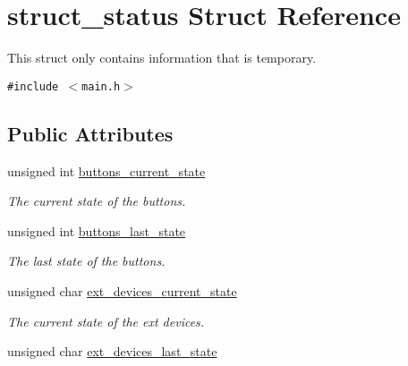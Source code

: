 \hypertarget{structstruct__status}{
\section{struct\_\-status Struct Reference}
\label{structstruct__status}
}
This struct only contains information that is temporary.  


{\tt \#include $<$main.h$>$}

\subsection*{Public Attributes}
\begin{CompactItemize}
\item 
\hypertarget{structstruct__status_17075fb3335e44596c7480fccd4354a5}{
unsigned int \hyperlink{structstruct__status_17075fb3335e44596c7480fccd4354a5}{buttons\_\-current\_\-state}}
\label{structstruct__status_17075fb3335e44596c7480fccd4354a5}

\begin{CompactList}\small\item\em The current state of the buttons. \item\end{CompactList}\item 
\hypertarget{structstruct__status_73d35cd75aa069f7718f242f08217dbd}{
unsigned int \hyperlink{structstruct__status_73d35cd75aa069f7718f242f08217dbd}{buttons\_\-last\_\-state}}
\label{structstruct__status_73d35cd75aa069f7718f242f08217dbd}

\begin{CompactList}\small\item\em The last state of the buttons. \item\end{CompactList}\item 
\hypertarget{structstruct__status_6300b45fc1b3f0a14c659a9d5da638fb}{
unsigned char \hyperlink{structstruct__status_6300b45fc1b3f0a14c659a9d5da638fb}{ext\_\-devices\_\-current\_\-state}}
\label{structstruct__status_6300b45fc1b3f0a14c659a9d5da638fb}

\begin{CompactList}\small\item\em The current state of the ext devices. \item\end{CompactList}\item 
\hypertarget{structstruct__status_466e0b0b014bf5cb62e205ac58dde530}{
unsigned char \hyperlink{structstruct__status_466e0b0b014bf5cb62e205ac58dde530}{ext\_\-devices\_\-last\_\-state}}
\label{structstruct__status_466e0b0b014bf5cb62e205ac58dde530}


\end{CompactItemize}
